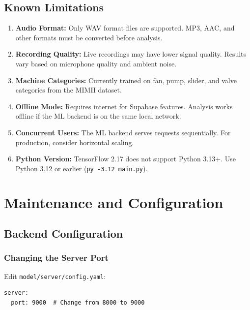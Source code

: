 \documentclass[10pt, a4paper, oneside]{report}
\begin{document}
\section{Known Limitations}

\begin{enumerate}[leftmargin=*, nosep]
  \item \textbf{Audio Format:} Only WAV format files are supported. MP3, AAC, and other formats must be converted before analysis.
  \item \textbf{Recording Quality:} Live recordings may have lower signal quality. Results vary based on microphone quality and ambient noise.
  \item \textbf{Machine Categories:} Currently trained on fan, pump, slider, and valve categories from the MIMII dataset.
  \item \textbf{Offline Mode:} Requires internet for Supabase features. Analysis works offline if the ML backend is on the same local network.
  \item \textbf{Concurrent Users:} The ML backend serves requests sequentially. For production, consider horizontal scaling.
  \item \textbf{Python Version:} TensorFlow 2.17 does not support Python 3.13+. Use Python 3.12 or earlier (\texttt{py -3.12 main.py}).
\end{enumerate}


\chapter{Maintenance and Configuration}
\label{ch:maintenance}

\section{Backend Configuration}
\label{sec:backend-config}

\subsection{Changing the Server Port}

Edit \texttt{model/server/config.yaml}:
\begin{lstlisting}
server:
  port: 9000  # Change from 8000 to 9000
\end{lstlisting}
\end{document}
